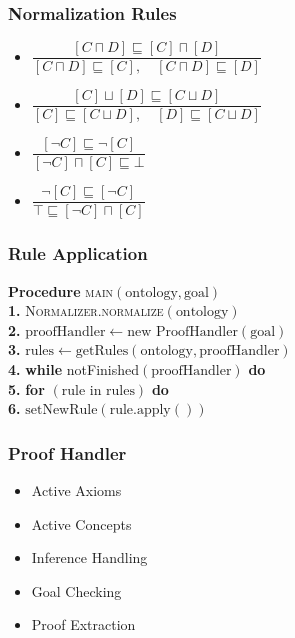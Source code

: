 \documentclass{beamer}
\begin{document}
\begin{frame}
\frametitle{Normalization Rules}
\begin{center}
    \begin{itemize}
        \item $ \dfrac{[C \sqcap D] \sqsubseteq [C] \sqcap [D]}{ [C \sqcap D] \sqsubseteq [C], \quad [C \sqcap D] \sqsubseteq [D]}$
        \item $ \dfrac{[C] \sqcup [D] \sqsubseteq [C \sqcup D]}{ [C] \sqsubseteq [C \sqcup D], \quad [D] \sqsubseteq [C \sqcup D]}$
        \item $ \dfrac{[\neg C] \sqsubseteq \neg [C] }{ [\neg C ] \sqcap [C] \sqsubseteq \bot}$
        \item $ \dfrac{\neg [C] \sqsubseteq [\neg C] }{ \top \sqsubseteq [\neg C ] \sqcap [C]}$
      \end{itemize}
\end{center}
\end{frame}

\begin{frame}
\frametitle{Rule Application}


  
  \textbf{Procedure} \textsc{main}$(\text{ontology}, \text{goal})$\\
  \hspace*{1em} \textbf{1.} \textsc{Normalizer.normalize}$(\text{ontology})$\\
  \hspace*{1em} \textbf{2.} $\text{proofHandler} \gets \text{new ProofHandler}(\text{goal})$\\
  \hspace*{1em} \textbf{3.} $\text{rules} \gets \text{getRules}(\text{ontology}, \text{proofHandler})$\\
  \hspace*{1em} \textbf{4.} \textbf{while} notFinished$(\text{proofHandler})$ \textbf{do}\\
  \hspace*{2em} \textbf{5.} \textbf{for} $(\text{rule in rules})$ \textbf{do}\\
  \hspace*{3em} \textbf{6.} $\text{setNewRule}(\text{rule.apply}())$\\
  


\end{frame}

\begin{frame}
    \frametitle{Proof Handler}
    \begin{itemize}
        \item Active Axioms
        \item Active Concepts
        \item Inference Handling
        \item Goal Checking
        \item Proof Extraction
    \end{itemize}
      
    
    \end{frame}
\end{document}
